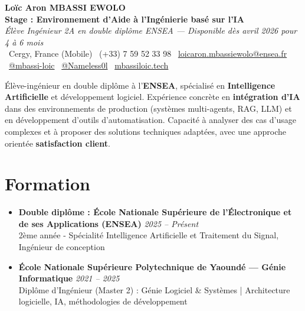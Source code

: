 \documentclass[a4paper,11pt]{article}
\begin{document}
\begin{center}
{\Large \textbf{Loïc Aron MBASSI EWOLO}} \\ \vspace{4pt}
\textbf{\large Stage : Environnement d'Aide à l'Ingénierie basé sur l'IA} \\
\textit{\small Élève Ingénieur 2A en double diplôme ENSEA — Disponible dès avril 2026 pour 4 à 6 mois} \\ \vspace{4pt}
\small
\faMapMarker\ Cergy, France (Mobile) \quad
\faPhone\ (+33) 7 59 52 33 98 \quad
\faEnvelope\ \href{mailto:loicaron.mbassiewolo@ensea.fr}{loicaron.mbassiewolo@ensea.fr} \\ \vspace{2pt}
\faLinkedin\ \href{https://www.linkedin.com/in/mbassi-loic-3942a9246/}{@mbassi-loic} \quad
\faGithub\ \href{https://github.com/Nameless0l}{@Nameless0l} \quad
\faGlobe\ \href{https://mbassiloic.tech}{mbassiloic.tech}
\end{center}

\vspace{-8pt}

\noindent\small{Élève-ingénieur en double diplôme à l'\textbf{ENSEA}, spécialisé en \textbf{Intelligence Artificielle} et développement logiciel.
Expérience concrète en \textbf{intégration d'IA} dans des environnements de production (systèmes multi-agents, RAG, LLM) et en développement d'outils d'automatisation.
Capacité à analyser des cas d'usage complexes et à proposer des solutions techniques adaptées, avec une approche orientée \textbf{satisfaction client}.}

\vspace{4pt}

\section{Formation}
\begin{itemize}[leftmargin=*, label={.}, nosep]
\item \textbf{Double diplôme : École Nationale Supérieure de l'Électronique et de ses Applications (ENSEA)} \hfill \textit{2025 -- Présent} \\
\small{2ème année - Spécialité Intelligence Artificielle et Traitement du Signal, Ingénieur de conception}
\vspace{2pt}
\item \textbf{École Nationale Supérieure Polytechnique de Yaoundé — Génie Informatique} \hfill \textit{2021 -- 2025} \\
\small{Diplôme d'Ingénieur (Master 2) : Génie Logiciel \& Systèmes | Architecture logicielle, IA, méthodologies de développement}
\end{itemize}
\end{document}
